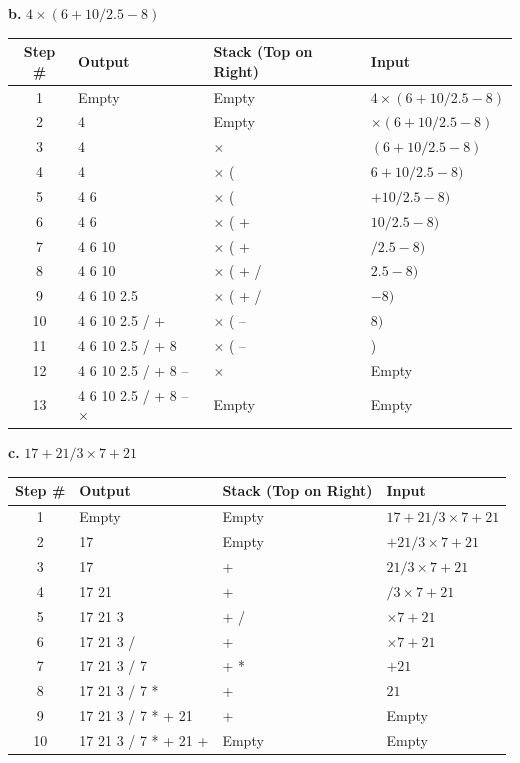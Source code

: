 \textbf{b. } $4 \times (6 + 10 / 2.5 - 8)$

\begin{tabularx}{\textwidth}{|c|X|X|X|}
\hline
\textbf{Step \#} & \textbf{Output} & \textbf{Stack (Top on Right)} & \textbf{Input} \\
\hline
1 & Empty & Empty & $4 \times (6 + 10 / 2.5 - 8)$ \\
\hline
2 & 4 & Empty & $\times (6 + 10 / 2.5 - 8)$ \\
\hline
3 & 4 & \(\times\) & $(6 + 10 / 2.5 - 8)$ \\
\hline
4 & 4 & \(\times\) ( & $6 + 10 / 2.5 - 8)$ \\
\hline
5 & 4 6 & \(\times\) ( & $+ 10 / 2.5 - 8)$ \\
\hline
6 & 4 6 & \(\times\) ( + & $10/ 2.5 - 8)$ \\
\hline
7 & 4 6 10 & \(\times\) ( + & $/2.5 - 8)$ \\
\hline
8 & 4 6 10 & \(\times\) ( + / & $2.5- 8)$ \\
\hline
9 & 4 6 10 2.5 & \(\times\) ( + / & $- 8)$ \\
\hline
10 & 4 6 10 2.5 / + & \(\times\) ( – & $8)$ \\
\hline
11 & 4 6 10 2.5 / + 8 & \(\times\) ( – & ) \\
\hline
12 & 4 6 10 2.5 / + 8 – & \(\times\) & Empty \\
\hline
13 & 4 6 10 2.5 / + 8 – \(\times\) & Empty & Empty \\
\hline
\end{tabularx}

\vspace{1em}

\textbf{c. } $17 + 21 / 3 \times 7 + 21$

\begin{center}
\begin{tabular}{|c|l|l|l|}
\hline
\textbf{Step \#} & \textbf{Output} & \textbf{Stack (Top on Right)} & \textbf{Input} \\
\hline
1 & Empty & Empty & $17 + 21 / 3 \times 7 + 21$ \\
2 & 17 & Empty & $+ 21 / 3 \times 7 + 21$ \\
3 & 17 & + & $21 / 3 \times 7 + 21$ \\
4 & 17 21 & + & $/ 3 \times 7 + 21$ \\
5 & 17 21 3 & + / & $\times 7 + 21$ \\
6 & 17 21 3 / & + & $\times 7 + 21$ \\
7 & 17 21 3 / 7 & + * & $+ 21$ \\
8 & 17 21 3 / 7 * & + & $21$ \\
9 & 17 21 3 / 7 * + 21 & + & Empty \\
10 & 17 21 3 / 7 * + 21 + & Empty & Empty \\
\hline
\end{tabular}
\end{center}

